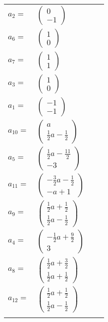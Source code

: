 \documentclass[1p]{elsarticle_modified}
\theoremstyle{definition}
\begin{document}
\begin{tabular}{m{7pt} m{180pt} m{7pt} m{180pt} }
\flushright $a_{2}=$&$\begin{pmatrix}0\\-1\end{pmatrix}$ \\
\flushright $a_{6}=$&$\begin{pmatrix}1\\0\end{pmatrix}$ \\
\flushright $a_{7}=$&$\begin{pmatrix}1\\1\end{pmatrix}$ \\
\flushright $a_{3}=$&$\begin{pmatrix}1\\0\end{pmatrix}$ \\
\flushright $a_{1}=$&$\begin{pmatrix}-1\\-1\end{pmatrix}$ \\
\flushright $a_{10}=$&$\begin{pmatrix}a\\\frac{1}{2} a-\frac{1}{2}\end{pmatrix}$ \\
\flushright $a_{5}=$&$\begin{pmatrix}\frac{1}{2} a-\frac{11}{2}\\-3\end{pmatrix}$ \\
\flushright $a_{11}=$&$\begin{pmatrix}-\frac{3}{2} a-\frac{1}{2}\\- a+1\end{pmatrix}$ \\
\flushright $a_{9}=$&$\begin{pmatrix}\frac{1}{2} a+\frac{1}{2}\\\frac{1}{2} a-\frac{1}{2}\end{pmatrix}$ \\
\flushright $a_{4}=$&$\begin{pmatrix}-\frac{1}{2} a+\frac{9}{2}\\3\end{pmatrix}$ \\
\flushright $a_{8}=$&$\begin{pmatrix}\frac{1}{2} a+\frac{3}{2}\\\frac{1}{2} a+\frac{1}{2}\end{pmatrix}$ \\
\flushright $a_{12}=$&$\begin{pmatrix}\frac{1}{2} a+\frac{1}{2}\\\frac{1}{2} a-\frac{1}{2}\end{pmatrix}$\\&\end{tabular}
\end{document}
